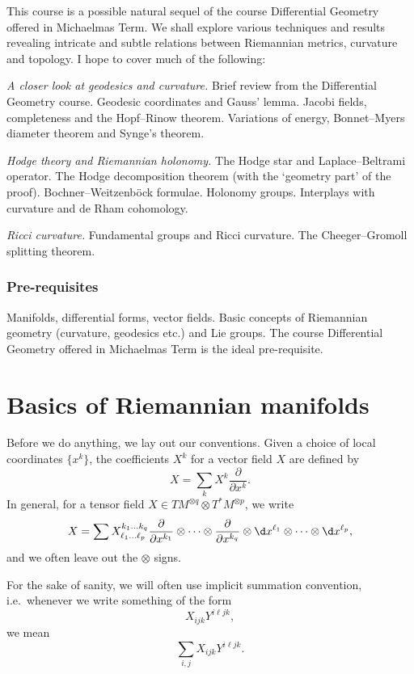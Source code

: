 \documentclass[a4paper]{article}
\begin{document}
\maketitle
{\small
\setlength{\parindent}{0em}
\setlength{\parskip}{1em}
This course is a possible natural sequel of the course Differential Geometry offered in Michaelmas Term. We shall explore various techniques and results revealing intricate and subtle relations between Riemannian metrics, curvature and topology. I hope to cover much of the following:

\emph{A closer look at geodesics and curvature.} Brief review from the Differential Geometry course. Geodesic coordinates and Gauss' lemma. Jacobi fields, completeness and the Hopf--Rinow theorem. Variations of energy, Bonnet--Myers diameter theorem and Synge's theorem.

\emph{Hodge theory and Riemannian holonomy.} The Hodge star and Laplace--Beltrami operator. The Hodge decomposition theorem (with the `geometry part' of the proof). Bochner--Weitzenb\"ock formulae. Holonomy groups. Interplays with curvature and de Rham cohomology.

\emph{Ricci curvature.} Fundamental groups and Ricci curvature. The Cheeger--Gromoll splitting theorem.

\subsubsection*{Pre-requisites}
Manifolds, differential forms, vector fields. Basic concepts of Riemannian geometry (curvature, geodesics etc.) and Lie groups. The course Differential Geometry offered in Michaelmas Term is the ideal pre-requisite.
}
\tableofcontents

\section{Basics of Riemannian manifolds}
Before we do anything, we lay out our conventions. Given a choice of local coordinates $\{x^k\}$, the coefficients $X^k$ for a vector field $X$ are defined by
\[
  X = \sum_k X^k \frac{\partial}{\partial x^k}.
\]
In general, for a tensor field $X \in TM^{\otimes q} \otimes T^*M^{\otimes p}$, we write
\[
  X = \sum X^{k_1 \ldots k_q}_{\ell_1 \ldots \ell_p} \frac{\partial}{\partial x^{k_1}} \otimes \cdots \otimes \frac{\partial}{\partial x^{k_q}} \otimes \d x^{\ell_1} \otimes \cdots \otimes \d x^{\ell_p},
\]
and we often leave out the $\otimes$ signs.

For the sake of sanity, we will often use implicit summation convention, i.e.\ whenever we write something of the form
\[
  X_{ijk} Y^{i\ell jk},
\]
we mean
\[
  \sum_{i, j} X_{ijk} Y^{i\ell jk}.
\]
\end{document}
